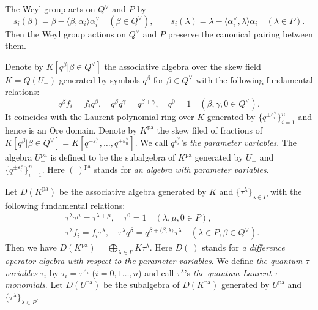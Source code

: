 \documentclass[12pt,twoside]{article}
\newcommand\tU{{\widetilde U}}
\newcommand\tw{{\widetilde w}}
\newcommand\bra{\langle}
\newcommand\ket{\rangle}
\newcommand\av{\alpha^\vee}
\newcommand\eps{\varepsilon}
\newcommand\epsv{\eps^\vee}
\newcommand\Qv{Q^\vee}
\newcommand\pa{{\mathrm{pa}}}
\theoremstyle{plain} %
\theoremstyle{definition} %
\theoremstyle{definition} %
\numberwithin{theorem}{section}
\numberwithin{equation}{section}
\numberwithin{figure}{section}
\numberwithin{table}{section}
\begin{document}
The Weyl group acts on $\Qv$ and $P$ by
\begin{equation*}
 s_i(\beta) = \beta - \bra\beta,\alpha_i\ket\av_i \quad (\beta\in\Qv), \qquad
 s_i(\lambda) = \lambda - \bra\av_i,\lambda\ket\alpha_i \quad (\lambda\in P).
\end{equation*}
Then the Weyl group actions on $\Qv$ and $P$ preserve the canonical pairing
between them.
 
Denote by $K[q^\beta|\beta\in\Qv]$ the associative algebra over 
the skew field $K=Q(U_-)$ generated by symbols $q^\beta$
for $\beta\in\Qv$ with the following fundamental relations:
\begin{equation*}
 q^\beta f_i = f_i q^\beta, \quad
 q^\beta q^\gamma = q^{\beta+\gamma}, \quad
 q^0 = 1 \quad (\beta,\gamma,0\in\Qv).
\end{equation*}
It coincides with the Laurent polynomial ring over $K$ 
generated by $\{q^{\pm\epsv_i}\}_{i=1}^n$ 
and hence is an Ore domain.
Denote by $K^\pa$ the skew filed of fractions 
of $K[q^\beta|\beta\in\Qv]=K[q^{\pm\epsv_1},\ldots,q^{\pm\epsv_n}]$.
We call $q^{\epsv_i}$'s {\em the parameter variables}. 
The algebra $U_-^\pa$ %
is defined to be the subalgebra of $K^\pa$
generated by $U_-$ %
and $\{q^{\pm\epsv_i}\}_{i=1}^n$.
Here $(\ )^\pa$ stands for {\em an algebra with parameter variables}.

Let $D(K^\pa)$ be the associative algebra generated by $K$ and $\{\tau^\lambda\}_{\lambda\in P}$
with the following fundamental relations:
\begin{align*}
 &
 \tau^\lambda\tau^\mu = \tau^{\lambda+\mu}, \quad
 \tau^0 = 1 \quad (\lambda,\mu,0\in P),
 \\ &
 \tau^\lambda f_i = f_i \tau^\lambda, \quad
 \tau^\lambda q^\beta = q^{\beta + \bra\beta,\lambda\ket} \tau^\lambda \quad
 (\lambda\in P, \beta\in\Qv). 
\end{align*}
Then we have $D(K^\pa) = \bigoplus_{\lambda\in P} K \tau^\lambda$.
Here $D(\ )$ stands for 
{\em a difference operator algebra with respect to the parameter variables}.
We define {\em the quantum $\tau$-variables} $\tau_i$ 
by $\tau_i=\tau^{\Lambda_i}$
($i=0,1\ldots,n$) and call $\tau^\lambda$'s 
{\em the quantum Laurent $\tau$-monomials}.
Let $D(U_-^\pa)$ be the subalgebra of $D(K^\pa)$ generated by 
$U_-^\pa$ and $\{\tau^\lambda\}_{\lambda\in P}$.

\end{document}

